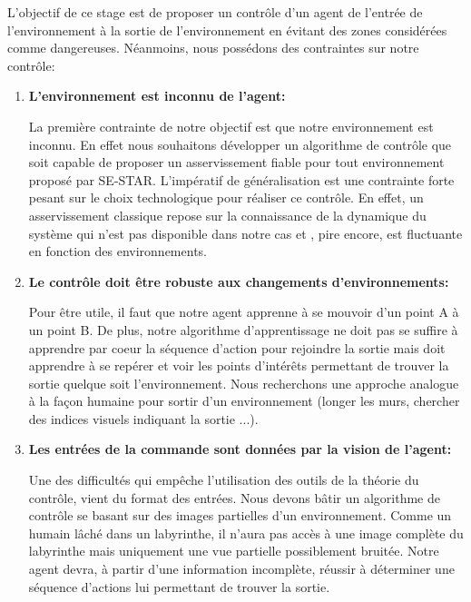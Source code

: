 L'objectif de ce stage est de proposer un contrôle d'un agent de l'entrée de l'environnement à la sortie de l'environnement en évitant des zones considérées comme dangereuses. Néanmoins, nous possédons des contraintes sur notre contrôle:     

\begin{enumerate}
    \item \textbf{L'environnement est inconnu de l'agent:}
    \smallskip
    
    La première contrainte de notre objectif est que notre environnement est inconnu. En effet nous souhaitons développer un algorithme de contrôle que soit capable de proposer un asservissement fiable pour tout environnement proposé par SE-STAR. L'impératif de généralisation est une contrainte forte pesant sur le choix technologique pour réaliser ce contrôle. En effet, un asservissement classique repose sur la connaissance de la dynamique du système qui n'est pas disponible dans notre cas et , pire encore, est fluctuante en fonction des environnements.
    
    \item \textbf{Le contrôle doit être robuste aux changements d'environnements:}
    \smallskip
    
    Pour être utile, il faut que notre agent apprenne à se mouvoir d'un point A à un point B. De plus, notre algorithme d'apprentissage ne doit pas se suffire à apprendre par coeur la séquence d'action pour rejoindre la sortie mais doit apprendre à se repérer et voir les points d'intérêts permettant de trouver la sortie quelque soit l'environnement. Nous recherchons une approche analogue à la façon humaine  pour sortir d'un environnement (longer les murs, chercher des indices visuels indiquant la sortie ...).
 
    \item \textbf{Les entrées de la commande sont données par la vision de l'agent:}
    \smallskip
    
    Une des difficultés qui empêche l'utilisation des outils de la théorie du contrôle, vient du format des entrées. Nous devons bâtir un algorithme de contrôle se basant sur des images partielles d'un environnement. Comme un humain lâché dans un labyrinthe, il n'aura pas accès à une image complète du labyrinthe mais uniquement une vue partielle possiblement bruitée. Notre agent devra, à partir d'une information incomplète, réussir à déterminer une séquence d'actions lui permettant de trouver la sortie.
    
  
\end{enumerate}


